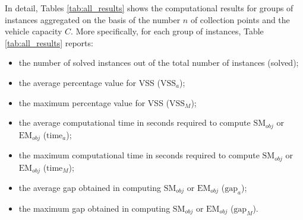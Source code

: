 \documentclass[authoryear,preprint,12pt]{elsarticle}
\begin{document}
In detail, Tables \ref{tab:all_results} shows the computational results for groups of instances aggregated on the basis of the number $n$ of collection points and the vehicle capacity $C$. 
More specifically, for each group of instances, Table \ref{tab:all_results} 
reports:
\begin{itemize}
\item the number of solved instances out of the total number of instances (solved);
\item the average percentage value for VSS ($\text{VSS}_a$);
\item the maximum percentage value for VSS ($\text{VSS}_M$);
\item the average computational time in seconds required to compute $\text{SM}_{obj}$ or $\text{EM}_{obj}$ ($\text{time}_a$);
\item the maximum computational time in seconds required to compute $\text{SM}_{obj}$ or $\text{EM}_{obj}$ ($\text{time}_M$);
\item the average gap obtained in computing $\text{SM}_{obj}$ or $\text{EM}_{obj}$ ($\text{gap}_a$);
\item the maximum gap obtained in computing $\text{SM}_{obj}$ or $\text{EM}_{obj}$ ($\text{gap}_M$).  
\end{itemize}

\end{document}
